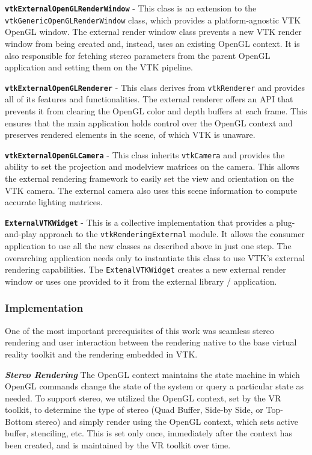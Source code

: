 \textbf{\texttt{vtkExternalOpenGLRenderWindow}} - This class is an extension to
the \texttt{vtkGenericOpenGLRenderWindow} class, which provides a
platform-agnostic VTK OpenGL window.
The external render window class prevents a new VTK render window from being
created and, instead, uses an existing OpenGL context.
It is also responsible for fetching stereo parameters from the parent OpenGL
application and setting them on the VTK pipeline.

\textbf{\texttt{vtkExternalOpenGLRenderer}} - This class derives from
\texttt{vtkRenderer} and provides all of its features and functionalities. The
external renderer offers an API that prevents it from clearing the OpenGL color
and depth buffers at each frame. This ensures that the main application holds
control over the OpenGL context and preserves rendered elements in the scene, of
which VTK is unaware.

\textbf{\texttt{vtkExternalOpenGLCamera}} - This class inherits
\texttt{vtkCamera} and provides the ability to set the projection and modelview
matrices on the camera. This allows the external rendering framework to easily
set the view and orientation on the VTK camera. The external camera also uses
this scene information to compute accurate lighting matrices.

\textbf{\texttt{ExternalVTKWidget}} - This is a collective implementation that
provides a plug-and-play approach to the \texttt{vtkRenderingExternal} module.
It allows the consumer application to use all the new classes as described above
in just one step. The overarching application needs only to instantiate this
class to use VTK's external rendering capabilities. The
\texttt{ExtenalVTKWidget} creates a new external render window or uses one
provided to it from the external library / application.

\subsubsection{Implementation}

One of the most important prerequisites of this work was seamless stereo rendering and user interaction between the rendering native to the base virtual reality toolkit and the rendering embedded in VTK. 

\textbf{\textit{Stereo Rendering}} The OpenGL context maintains the state machine in which OpenGL commands change the state of the system or query a particular state as needed.
To support stereo, we utilized the OpenGL context, set by the VR toolkit, to determine the type of stereo (Quad Buffer, Side-by Side, or Top-Bottom stereo) and simply render using the OpenGL context, which sets active buffer, stenciling, etc.
This is set only once, immediately after the context has been created, and is maintained by the VR toolkit over time. 

